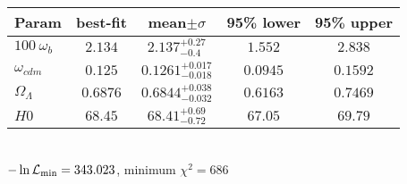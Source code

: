 \begin{tabular}{|l|c|c|c|c|} 
 \hline 
Param & best-fit & mean$\pm\sigma$ & 95\% lower & 95\% upper \\ \hline 
$100~\omega_{b }$ &$2.134$ & $2.137_{-0.4}^{+0.27}$ & $1.552$ & $2.838$ \\ 
$\omega_{cdm }$ &$0.125$ & $0.1261_{-0.018}^{+0.017}$ & $0.0945$ & $0.1592$ \\ 
$\Omega_{\Lambda }$ &$0.6876$ & $0.6844_{-0.032}^{+0.038}$ & $0.6163$ & $0.7469$ \\ 
$H0$ &$68.45$ & $68.41_{-0.72}^{+0.69}$ & $67.05$ & $69.79$ \\ 
\hline 
 \end{tabular} \\ 
$-\ln{\cal L}_\mathrm{min} =343.023$, minimum $\chi^2=686$ \\ 
